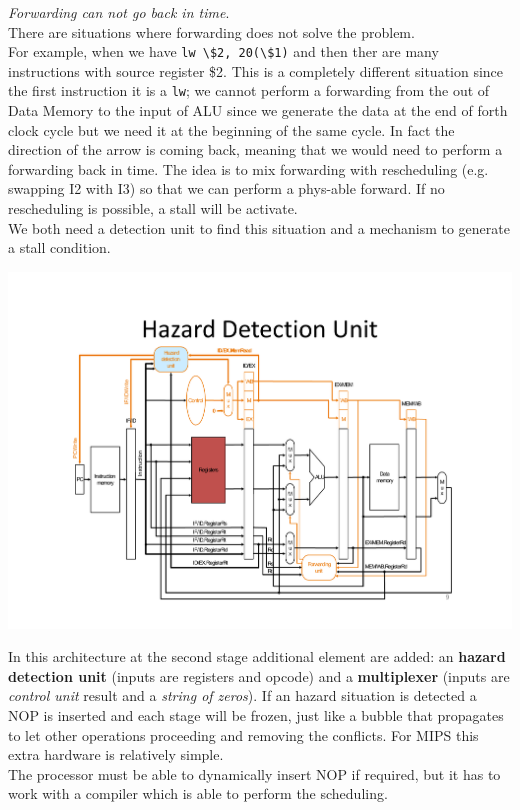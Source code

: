 \textit{Forwarding can not go back in time}.\\
There are situations where forwarding does not solve the problem.\\ For example,
when we have \verb|lw \$2, 20(\$1)| and then ther are many instructions with
source register \$2. This is a completely different situation since the first
instruction it is a \verb|lw|; we cannot perform a forwarding from the out of
Data Memory to the input of ALU since we generate the data at the end of forth
clock cycle but we need it at the beginning of the same cycle.  In fact the
direction of the arrow is coming back, meaning that we would need to perform a
forwarding back in time.  The idea is to mix forwarding with rescheduling (e.g.
swapping I2 with I3) so that we can perform a phys-able forward. If no
rescheduling is possible, a stall will be activate.\\
We both need a detection unit to find this situation and a mechanism to
generate a stall condition.
\begin{center}
  \includegraphics[width=1.0\linewidth]{img/img3/mips7}
\end{center}
In this architecture at the second stage additional element are added: an
\textbf{hazard detection unit} (inputs are registers and opcode) and a
\textbf{multiplexer} (inputs are \textit{control unit} result and a
\textit{string of zeros}). If an hazard situation is detected a NOP is inserted
and each stage will be frozen, just like a bubble that propagates to let other
operations proceeding and removing the conflicts. For MIPS this extra hardware
is relatively simple.\\The processor must be able to dynamically insert NOP if
required, but it has to work with a compiler which is able to perform the
scheduling.
